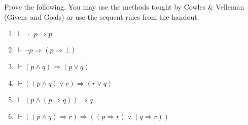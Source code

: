 \documentclass[11pt]{article}
\begin{document}

Prove the following.  You may use the methods taught by Cowles \&
Velleman (Givens and Goals) or use the sequent rules from the handout.

\goodbreak\noindent
\begin{enumerate}
\item  $\vdash \neg\neg{}p \Rightarrow {}p$\\
\item  $\vdash \neg{}p  \Rightarrow (p\Rightarrow\bot)$\\
\item  $\vdash (p\wedge{}q) \Rightarrow (p\vee{}q)$\\
 \item  $\vdash ((p\wedge{}q) \vee r) \Rightarrow (r\vee{}q)$\\
\item  $\vdash  (p \wedge (p \Rightarrow q)) \Rightarrow q$\\
\item   $\vdash ((p \wedge q) \Rightarrow r) \Rightarrow ((p \Rightarrow r) \vee (q \Rightarrow r))$\\







\end{enumerate}
\end{document}

